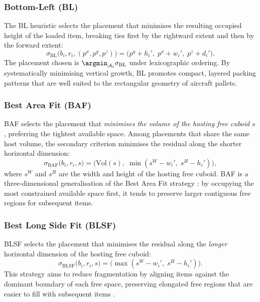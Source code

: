 \subsubsection{Bottom-Left (BL)}
\label{sec:bl}

The BL heuristic selects the placement that minimises the resulting
occupied height of the loaded item, breaking ties first by the
rightward extent and then by the forward extent:
\begin{equation}
\label{eq:score-bl}
\sigma_{\mathrm{BL}}\bigl(b_i, r_i, (p^x, p^y, p^z)\bigr)
= \bigl(p^y + h_i',\; p^x + w_i',\; p^z + d_i'\bigr).
\end{equation}
The placement chosen is $\argmin_{\mathcal{A}_t} \sigma_{\mathrm{BL}}$
under lexicographic ordering.
By systematically minimising vertical growth, BL promotes compact,
layered packing patterns that are well suited to the rectangular
geometry of aircraft pallets.

\subsubsection{Best Area Fit (BAF)}
\label{sec:baf}

BAF selects the placement that \emph{minimises the volume of the hosting
free cuboid} $s$, preferring the tightest available space.
Among placements that share the same host volume, the secondary criterion
minimises the residual along the shorter horizontal dimension:
\begin{equation}
\label{eq:score-baf}
\sigma_{\mathrm{BAF}}\bigl(b_i, r_i, s\bigr)
= \bigl(\mathrm{Vol}(s),\;
         \min(s^W - w_i',\; s^H - h_i')\bigr),
\end{equation}
where $s^W$ and $s^H$ are the width and height of the hosting free
cuboid.
BAF is a three-dimensional generalisation of the Best Area Fit strategy
\citep{Hassan2019}: by occupying the most constrained available space
first, it tends to preserve larger contiguous free regions for subsequent
items.

\subsubsection{Best Long Side Fit (BLSF)}
\label{sec:blsf}

BLSF selects the placement that minimises the residual along the
\emph{longer} horizontal dimension of the hosting free cuboid:
\begin{equation}
\label{eq:score-blsf}
\sigma_{\mathrm{BLSF}}\bigl(b_i, r_i, s\bigr)
= \bigl(\max(s^W - w_i',\; s^H - h_i')\bigr).
\end{equation}
This strategy aims to reduce fragmentation by aligning items against the
dominant boundary of each free space, preserving elongated free regions
that are easier to fill with subsequent items
\citep{Martinez2021}.


